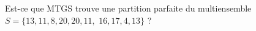 \documentclass[11pt]{article}
\begin{document}
  \begin{exercice}{}
    Est-ce que MTGS trouve une partition parfaite du multiensemble $S=\{13, 11, 8, 20, 20, 11,$ $ 16, 17, 4, 13\}$ ?
  \end{exercice}




  
  
\end{document}
